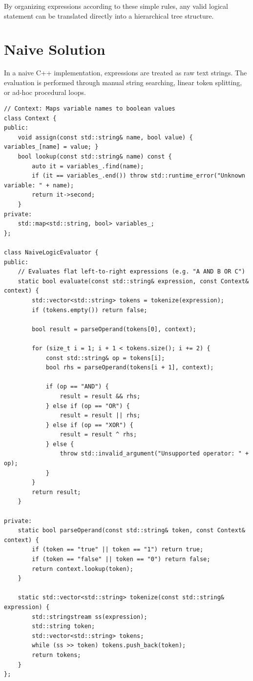 \documentclass[12pt,a4paper]{article}
\begin{document}
By organizing expressions according to these simple rules, any valid logical statement can be translated directly into a hierarchical tree structure.

\newpage
\section{Naive Solution}

In a naive C++ implementation, expressions are treated as raw text strings. The evaluation is performed through manual string searching, linear token splitting, or ad-hoc procedural loops.

\begin{lstlisting}[caption=Naive Boolean Expression Evaluator (\texttt{naive.cpp})]
// Context: Maps variable names to boolean values
class Context {
public:
    void assign(const std::string& name, bool value) { variables_[name] = value; }
    bool lookup(const std::string& name) const {
        auto it = variables_.find(name);
        if (it == variables_.end()) throw std::runtime_error("Unknown variable: " + name);
        return it->second;
    }
private:
    std::map<std::string, bool> variables_;
};

class NaiveLogicEvaluator {
public:
    // Evaluates flat left-to-right expressions (e.g. "A AND B OR C")
    static bool evaluate(const std::string& expression, const Context& context) {
        std::vector<std::string> tokens = tokenize(expression);
        if (tokens.empty()) return false;

        bool result = parseOperand(tokens[0], context);

        for (size_t i = 1; i + 1 < tokens.size(); i += 2) {
            const std::string& op = tokens[i];
            bool rhs = parseOperand(tokens[i + 1], context);

            if (op == "AND") {
                result = result && rhs;
            } else if (op == "OR") {
                result = result || rhs;
            } else if (op == "XOR") {
                result = result ^ rhs;
            } else {
                throw std::invalid_argument("Unsupported operator: " + op);
            }
        }
        return result;
    }

private:
    static bool parseOperand(const std::string& token, const Context& context) {
        if (token == "true" || token == "1") return true;
        if (token == "false" || token == "0") return false;
        return context.lookup(token);
    }

    static std::vector<std::string> tokenize(const std::string& expression) {
        std::stringstream ss(expression);
        std::string token;
        std::vector<std::string> tokens;
        while (ss >> token) tokens.push_back(token);
        return tokens;
    }
};
\end{lstlisting}
\end{document}
